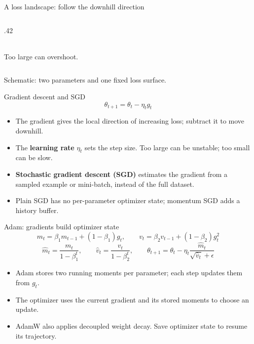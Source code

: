 \documentclass[handout]{beamer}
\begin{document}
\begin{frame}{A loss landscape: follow the downhill direction}
\begin{columns}[c]
\begin{column}{.42\linewidth}
\\[-2pt]
      {\scriptsize Too large can overshoot.}
    \end{column}
  \end{columns}
  \vspace{4pt}
  {\scriptsize\color{neutraldark}Schematic: two parameters and one fixed loss surface.}
\end{frame}

\begin{frame}{Gradient descent and SGD}
  \[
    \theta_{t+1}=\theta_t-\eta_t g_t
  \]
  \begin{itemize}
      \setlength{\itemsep}{8pt}
    \item The gradient gives the local direction of increasing loss; subtract it to move downhill.
    \item The \textbf{learning rate} $\eta_t$ sets the step size. Too large can be unstable; too small can be slow.
    \item \textbf{Stochastic gradient descent (SGD)} estimates the gradient from a sampled example or mini-batch, instead of the full dataset.
    \item Plain SGD has no per-parameter optimizer state; momentum SGD adds a history buffer.
  \end{itemize}
\end{frame}

\begin{frame}{Adam: gradients build optimizer state}
  \[
    m_t=\beta_1m_{t-1}+(1-\beta_1)g_t,\qquad
    v_t=\beta_2v_{t-1}+(1-\beta_2)g_t^2
  \]
  \[
    \hat m_t=\frac{m_t}{1-\beta_1^t},\qquad
    \hat v_t=\frac{v_t}{1-\beta_2^t},\qquad
    \theta_{t+1}=\theta_t-\eta_t\frac{\hat m_t}{\sqrt{\hat v_t}+\epsilon}
  \]
  \begin{itemize}
    \item Adam stores two running moments per parameter; each step updates them from $g_t$.
    \item The optimizer uses the current gradient and its stored moments to choose an update.
    \item AdamW also applies decoupled weight decay. Save optimizer state to resume its trajectory.
  \end{itemize}
\end{frame}
\end{document}
